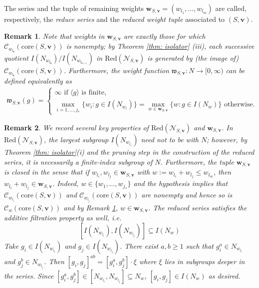 \documentclass[pdflatex,sn-mathphys-num]{sn-jnl}%
\theoremstyle{thmstyleone}%
\theoremstyle{thmstyletwo}%
\newtheorem{rem}{Remark}%
\theoremstyle{thmstylethree}%
\begin{document}
The series and the tuple of remaining weights
$ \mathbf{w}_{S,\mathbf v} = (w_{l_1},\ldots, w_{l_m})$
are called, respectively, the \textit{reduce series} and the \textit{reduced weight tuple} associated to $(S,\mathbf v)$. 


\begin{rem}
\label{rem: reduced_wt}
    Note that weights in  $\mathbf{w}_{S,\mathbf v}$ are exactly those for which $\mathcal{C}_{w_{l_\bullet}}(\mbox{core}(S,\mathbf{v}))$ is nonempty; by Theorem \ref{thm: isolator} (iii), each successive quotient $I(N_{w_{l_\bullet}})/ I(N_{w_{l_{\bullet + 1}}}) $
     in $\mbox{Red}( \mathcal{N}_{S, \mathbf v})$ is generated by (the image of) $\mathcal{C}_{w_{l_\bullet}}(\mbox{core}(S,\mathbf v))$. Furthermore, the weight function  $ \mathfrak{w}_{S,\mathbf{v}}: N \to [0, \infty)$ can be defined equivalently as 
\begin{align*}
    \mathfrak{w}_{S,\mathbf{v}}(g) =\left\{
    \begin{array}{l}
        \infty \text{ if } \langle g\rangle \text{ is finite},\\
        \underset{i=1,\ldots,j_*}{\max}\{w_i: g\in I(N_{w_i})\}  =  \underset{w \in \mathbf{w}_{S,\mathbf v} }{\max}\{w: g\in I(N_{w})\} \text{ otherwise.}
    \end{array}\right.
\end{align*}
\end{rem}


\begin{rem}
\label{rem: reduced_se}
We record several key properties of  $\mbox{Red}(\mathcal{N}_{S,\mathbf{v}})$ and $\mathbf{w}_{S,\mathbf v}$. 
In $\mbox{Red}(\mathcal{N}_{S,\mathbf{v}})$, the largest subgroup $I(N_{w_{l_1}})$ need not to be with $N$; however, by Theorem \ref{thm: isolator}(i) and the pruning step in the construction of the reduced series, it is necessarily a finite-index subgroup of $N$. Furthermore, 
the tuple $\mathbf{w}_{S,\mathbf v}$ is closed in the sense that if $w_{l_i}, w_{l_j} \in \mathbf{w}_{S,\mathbf v}$ with 
    $w:= w_{l_i} + w_{l_j} \le w_{l_m} $, then $w_{l_i} + w_{l_j} \in \mathbf{w}_{S,\mathbf v}$.  Indeed, $w\in \{w_1,\ldots, w_{j_*}\}$ and 
    the hypothesis implies that $\mathcal{C}_{w_{l_i}}(\mbox{core}(S,\mathbf v))$ and $\mathcal{C}_{w_{l_j}}(\mbox{core}(S,\mathbf v))$ are nonempty and hence so is $\mathcal{C}_{w}(\mbox{core}(S,\mathbf v))$ and by Remark \ref{rem: reduced_wt}, $w \in \mathbf{w}_{S,\mathbf v}$. 
    The reduced series satisfies the additive filtration property as well, i.e.   
    $$[I(N_{w_{l_i}}), I(N_{w_{l_j}})] \subseteq I(N_w)$$
    Take $g_i \in I(N_{w_{l_i}})$ and $g_j \in I(N_{w_{l_j}})$. There exist $a,b \ge 1$ such that $g_i^a \in N_{w_{l_i}}$ and $g_j^b \in N_{w_{l_j}}$. 
    Then $[g_i, g_j]^{ab} = [g_i^a, g_j^b] \cdot \xi $ where $\xi$  lies in subgroups deeper in the series. Since $ [g_i^a, g_j^b] \in [N_{w_{l_i}}, N_{w_{l_j}}] \subseteq N_{w}$,     $[g_i,g_j] \in I(N_w)$ as desired.  
\end{rem}
\end{document}

